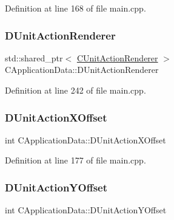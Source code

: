 Definition at line 168 of file main.\+cpp.

\hypertarget{classCApplicationData_a5aca1f832dd6387662f0d4441745cf6f}{}\label{classCApplicationData_a5aca1f832dd6387662f0d4441745cf6f} 
\subsubsection{\texorpdfstring{D\+Unit\+Action\+Renderer}{DUnitActionRenderer}}
{\footnotesize\ttfamily std\+::shared\+\_\+ptr$<$ \hyperlink{classCUnitActionRenderer}{C\+Unit\+Action\+Renderer} $>$ C\+Application\+Data\+::\+D\+Unit\+Action\+Renderer\hspace{0.3cm}{\ttfamily [protected]}}



Definition at line 242 of file main.\+cpp.

\hypertarget{classCApplicationData_aa47b53d283617575a4866c08d83e27c4}{}\label{classCApplicationData_aa47b53d283617575a4866c08d83e27c4} 
\subsubsection{\texorpdfstring{D\+Unit\+Action\+X\+Offset}{DUnitActionXOffset}}
{\footnotesize\ttfamily int C\+Application\+Data\+::\+D\+Unit\+Action\+X\+Offset\hspace{0.3cm}{\ttfamily [protected]}}



Definition at line 177 of file main.\+cpp.

\hypertarget{classCApplicationData_a8ccfb55bd25cba0e6eb66573ba9c8b3c}{}\label{classCApplicationData_a8ccfb55bd25cba0e6eb66573ba9c8b3c} 
\subsubsection{\texorpdfstring{D\+Unit\+Action\+Y\+Offset}{DUnitActionYOffset}}
{\footnotesize\ttfamily int C\+Application\+Data\+::\+D\+Unit\+Action\+Y\+Offset\hspace{0.3cm}{\ttfamily [protected]}}



